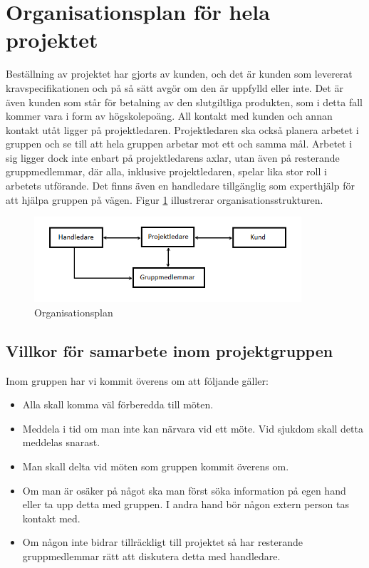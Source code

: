 \section{Organisationsplan för hela projektet}
Beställning av projektet har gjorts av kunden, och det är kunden som levererat kravspecifikationen och på så sätt avgör om den är uppfylld eller inte. Det är även kunden som står för betalning av den slutgiltliga produkten, som i detta fall kommer vara i form av högskolepoäng. All kontakt med kunden och annan kontakt utåt ligger på projektledaren. Projektledaren ska också planera arbetet i gruppen och se till att hela gruppen arbetar mot ett och samma mål. Arbetet i sig ligger dock inte enbart på projektledarens axlar, utan även på resterande gruppmedlemmar, där alla, inklusive projektledaren, spelar lika stor roll i arbetets utförande. Det finns även en handledare tillgänglig som experthjälp för att hjälpa gruppen på vägen. Figur \ref{organisationsplan} illustrerar organisationsstrukturen.

\begin{figure}[H]
	\begin{center}
		\includegraphics[keepaspectratio=true,width=375px]{grafik/organisationsplan.png}
		\caption{Organisationsplan}
		\label{organisationsplan}
	\end{center}
\end{figure}

\subsection{Villkor för samarbete inom projektgruppen}
Inom gruppen har vi kommit överens om att följande gäller:
\begin{itemize}
\item{Alla skall komma väl förberedda till möten.}
\item{Meddela i tid om man inte kan närvara vid ett möte. Vid sjukdom skall detta meddelas snarast.}
\item{Man skall delta vid möten som gruppen kommit överens om.}

\item{Om man är osäker på något ska man först söka information på egen hand eller ta upp detta med gruppen. I andra hand bör någon extern person tas kontakt med.}
\item{Om någon inte bidrar tillräckligt till projektet så har resterande gruppmedlemmar rätt att diskutera detta med handledare.}
\end{itemize}

\newpage